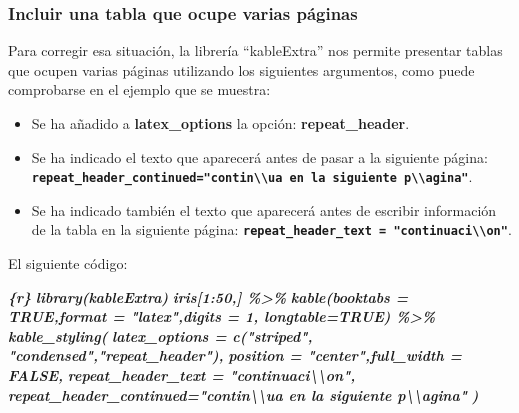 \documentclass[12pt,a4paper,oneside,]{article}
\newenvironment{Shaded}{\begin{snugshade}}{\end{snugshade}}
\newcommand{\InformationTok}[1]{\textcolor[rgb]{0.56,0.35,0.01}{\textbf{\textit{#1}}}}
\numberwithin{dummy}{section}
\theoremstyle{ocrenumbox}
\theoremstyle{blacknumex}
\theoremstyle{blacknumbox}
\theoremstyle{ocrenum}
\theoremstyle{ocrenum}
\begin{document}
\hypertarget{incluir-una-tabla-que-ocupe-varias-puxe1ginas}{%
\subsubsection{Incluir una tabla que ocupe varias
páginas}\label{incluir-una-tabla-que-ocupe-varias-puxe1ginas}}

Para corregir esa situación, la librería ``kableExtra'' nos permite
presentar tablas que ocupen varias páginas utilizando los siguientes
argumentos, como puede comprobarse en el ejemplo que se muestra:

\begin{itemize}
\item
  Se ha añadido a \textbf{latex\_options} la opción:
  \textbf{repeat\_header}.
\item
  Se ha indicado el texto que aparecerá antes de pasar a la siguiente
  página:
  \textbf{\texttt{repeat\_header\_continued="contin\textbackslash{}\textbackslash{}\textquotesingle{}ua\ en\ la\ siguiente\ p\textbackslash{}\textbackslash{}\textquotesingle{}agina"}}.
\item
  Se ha indicado también el texto que aparecerá antes de escribir
  información de la tabla en la siguiente página:
  \textbf{\texttt{repeat\_header\_text\ =\ "continuaci\textbackslash{}\textbackslash{}\textquotesingle{}on"}}.
\end{itemize}

El siguiente código:

\begin{Shaded}
\begin{Highlighting}[]
\InformationTok{\textasciigrave{}\textasciigrave{}\textasciigrave{}\{r\}}
\InformationTok{library(kableExtra) }
\InformationTok{iris[1:50,] \%\textgreater{}\% }
\InformationTok{  kable(booktabs = TRUE,format = "latex",digits = 1, longtable=TRUE) \%\textgreater{}\%}
\InformationTok{  kable\_styling(}
\InformationTok{   latex\_options = c("striped", "condensed","repeat\_header"), }
\InformationTok{   position = "center",full\_width = FALSE,}
\InformationTok{   repeat\_header\_text = "continuaci\textbackslash{}\textbackslash{}\textquotesingle{}on", }
\InformationTok{   repeat\_header\_continued="contin\textbackslash{}\textbackslash{}\textquotesingle{}ua en la siguiente p\textbackslash{}\textbackslash{}\textquotesingle{}agina"}
\InformationTok{  )}
\InformationTok{\textasciigrave{}\textasciigrave{}\textasciigrave{}}
\end{Highlighting}
\end{Shaded}
\end{document}
